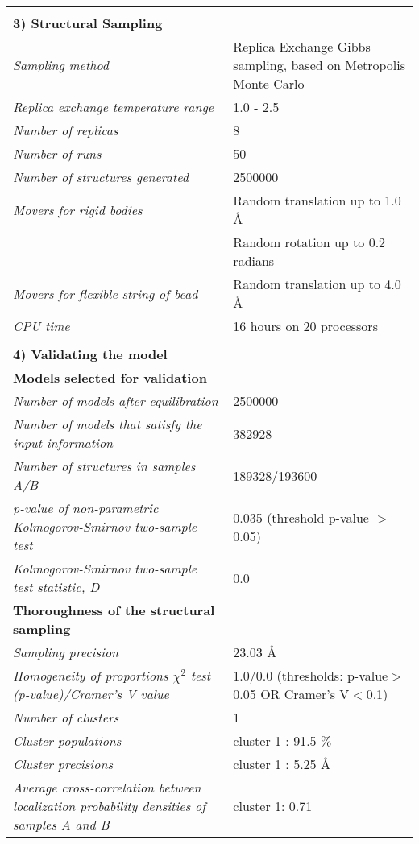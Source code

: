 \documentclass[8pt,a4paper]{article}
\begin{document}
\begin{longtable}{ p{} | p{} }
   &  \\
    \normalsize{\textbf{3) Structural Sampling}} & \\
    \hline
            \textit{Sampling method} & Replica Exchange Gibbs sampling, based on Metropolis Monte Carlo\\
                \textit{Replica exchange temperature range} & 1.0 - 2.5\\
                \textit{Number of replicas} & 8\\
                \textit{Number of runs} & 50\\
                \textit{Number of structures generated} & 2500000\\
                \textit{Movers for rigid bodies} & Random translation up to 1.0 \AA\\
            & Random rotation up to 0.2
 radians \\
                \textit{Movers for flexible string of bead} & Random translation up to 4.0 \AA\\
                \textit{CPU time} & 16 hours on 20 processors\\
        
   &  \\
  \normalsize{\textbf{4) Validating the model}} & \\
    \hline
   \textbf{Models selected for validation} & \\
    \hline
          \textit{Number of models after equilibration} & 2500000\\
                \textit{Number of models that satisfy the input information} & 382928\\
                \textit{Number of structures in samples A/B} & 189328/193600\\
                \textit{p-value of non-parametric Kolmogorov-Smirnov two-sample test} & 0.035 (threshold p-value $>$ 0.05)\\
                \textit{Kolmogorov-Smirnov two-sample test statistic, D} & 0.0\\
           \hline
    
    \textbf{Thoroughness of the structural sampling} & \\
    \hline
          \textit{Sampling precision} & 23.03 \AA \\
                \textit{Homogeneity of proportions $\chi^2$ test (p-value)/Cramer’s V value} & 1.0/0.0 (thresholds: p-value$>$0.05 OR Cramer's V$<$0.1)\\
                \textit{Number of clusters} & 1\\
                \textit{Cluster populations} & cluster 1 : 91.5 $\%$\\
                \textit{Cluster precisions} & cluster 1 : 5.25 \AA\\
                \textit{Average cross-correlation between localization probability densities of samples A and B} & cluster 1: 0.71\\
           \hline
  

\end{longtable}
\end{document}
